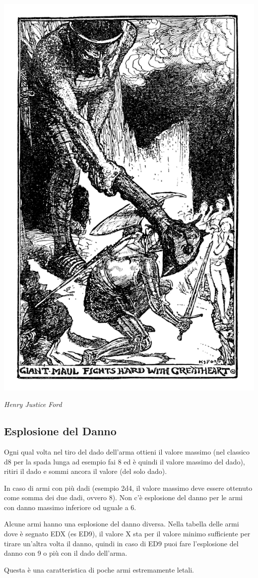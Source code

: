 \begin{multicols}{2}
\begin{center}
	\includegraphics[width=0.6\linewidth]{immagini/esplosionedanno.png}

	\emph{Henry Justice Ford}
\end{center}

\subsection{Esplosione del Danno}\label{esplosionedeldanno}

Ogni qual volta nel tiro del dado dell'arma ottieni il valore massimo (nel classico d8 per la spada lunga ad esempio fai 8 ed è quindi il valore massimo del dado), ritiri il dado e sommi ancora il valore (del solo dado).

In caso di armi con più dadi (esempio 2d4, il valore massimo deve essere ottenuto come somma dei due dadi, ovvero 8). Non c'è esplosione del danno per le armi con danno massimo inferiore od uguale a 6.

Alcune armi hanno una esplosione del danno diversa. Nella tabella delle armi dove è segnato EDX (es ED9), il valore X sta per il valore minimo sufficiente per tirare un'altra volta il danno, quindi in caso di ED9 puoi fare l'esplosione del danno con 9 o più con il dado dell'arma.

Questa è una caratteristica di poche armi estremamente letali.


\end{multicols}
